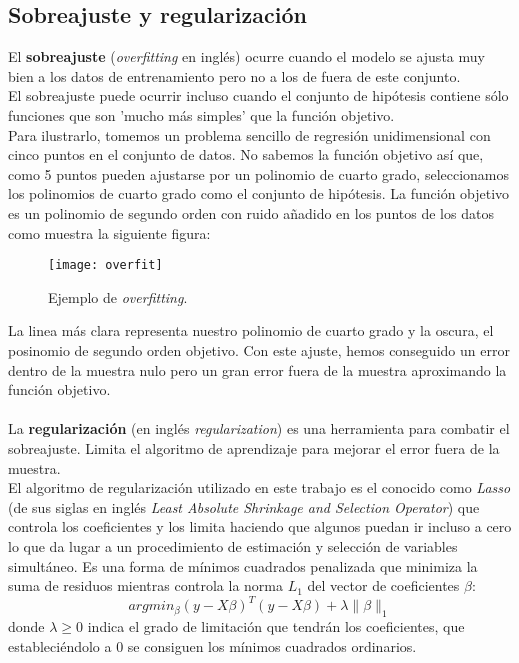 \subsection{Sobreajuste y regularización}
El \textbf{sobreajuste} (\textit{overfitting} en inglés) ocurre cuando el modelo se ajusta muy bien a los datos de entrenamiento pero no a los de fuera de este conjunto.\\
El sobreajuste puede ocurrir incluso cuando el conjunto de hipótesis contiene sólo funciones que son 'mucho más simples' que la función objetivo. \cite{abu2012learning}\\
Para ilustrarlo, tomemos un problema sencillo de regresión unidimensional con cinco puntos en el conjunto de datos. No sabemos la función objetivo así que, como 5 puntos pueden ajustarse por un polinomio de cuarto grado, seleccionamos los polinomios de cuarto grado como el conjunto de hipótesis. La función objetivo es un polinomio de segundo orden con ruido añadido en los puntos de los datos como muestra la siguiente figura:
\begin{figure}[H]
  \centering
  \texttt{[image: overfit]}
  \caption{Ejemplo de \textit{overfitting}. \cite{abu2012learning}}
  \label{fig:overfit}
\end{figure}
\begin{center}
\end{center}
La linea más clara representa nuestro polinomio de cuarto grado y la oscura, el posinomio de segundo orden objetivo. Con este ajuste, hemos conseguido un error dentro de la muestra nulo pero un gran error fuera de la muestra aproximando la función objetivo.\\\\
La \textbf{regularización} (en inglés \textit{regularization}) es una herramienta para combatir el sobreajuste. Limita el algoritmo de aprendizaje para mejorar el error fuera de la muestra.\\
El algoritmo de regularización utilizado en este trabajo es el conocido como \textit{Lasso} (de sus siglas en inglés \textit{Least Absolute Shrinkage and Selection Operator}) que controla los coeficientes y los limita haciendo que algunos puedan ir incluso a cero lo que da lugar a un procedimiento de estimación y selección de variables simultáneo. Es una forma de mínimos cuadrados penalizada que minimiza la suma de residuos mientras controla la norma $L_{1}$ del vector de coeficientes $\beta$:
\[ argmin_{\beta}(y-X\beta)^{T}(y-X\beta) + \lambda \parallel \beta \parallel_{1} \]
donde $\lambda \geq 0$ indica el grado de limitación que tendrán los coeficientes, que estableciéndolo a 0 se consiguen los mínimos cuadrados ordinarios.
\cite{hans2009bayesian}
